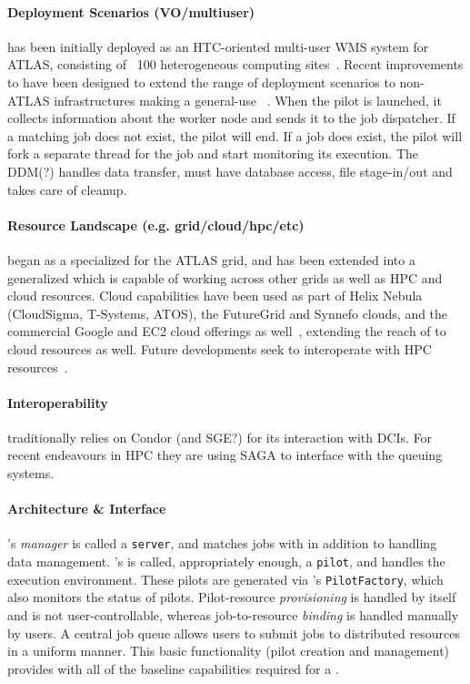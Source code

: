 \documentclass{sig-alternate}
\begin{document}
\paragraph{Deployment Scenarios (VO/multiuser)}
\panda has been initially deployed as an HTC-oriented multi-user WMS system for
ATLAS, consisting of ~100 heterogeneous computing
sites~\cite{maeno_pd2p:_2012}.
Recent improvements to \panda have been designed to extend the range of
deployment scenarios to non-ATLAS infrastructures making \panda a general-use
\pilotjob~\cite{nilsson2012recent}.
When the pilot is launched, it collects information about the worker node and
sends it to the job dispatcher.
If a matching job does not exist, the pilot will end. If a job does exist, the
pilot will fork a separate thread for the job and start monitoring its
execution.
The DDM(?) handles data transfer, must have database access, file stage-in/out
and takes care of cleanup.

\paragraph{Resource Landscape (e.g. grid/cloud/hpc/etc)}
\panda began as a specialized \pilotjob for the ATLAS grid, and has been
extended into a generalized \pilotjob which is capable of working across other
grids as well as HPC and cloud resources.
Cloud capabilities have been used as part of Helix Nebula (CloudSigma,
T-Systems, ATOS), the FutureGrid and Synnefo clouds, and the commercial Google
and EC2 cloud offerings as well~\cite{pandapresentation2013-06}, extending the
reach of \panda to cloud resources as well.
Future \panda developments seek to interoperate with HPC
resources~\cite{pandapresentation2013-06}.

\paragraph{Interoperability}
\panda traditionally relies on Condor (and SGE?) for its interaction with DCIs.
For recent endeavours in HPC they are using SAGA to interface with the queuing
systems.

\paragraph{Architecture \& Interface}
\panda's \textit{manager} is called a \texttt{\panda server}, and matches
jobs with \pilots in addition to handling data management.
\panda's \textit{\pilot}
is called, appropriately enough, a \texttt{pilot}, and handles the execution
environment.  These pilots are generated via \panda's \texttt{PilotFactory},
which also monitors the status of pilots.
Pilot-resource \textit{provisioning} is handled by \panda itself and is not
user-controllable, whereas job-to-resource \textit{binding} is handled
manually by users.
A central job queue allows users to submit jobs
to distributed resources in a uniform manner.
This basic functionality (pilot creation and management) provides \panda with
all of the baseline capabilities required for a \pilotjob.
\end{document}
